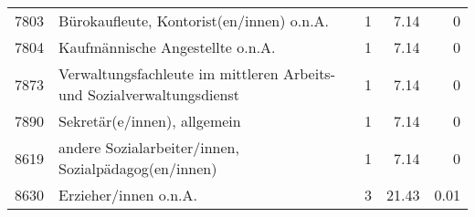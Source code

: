 \begin{longtable}{lXrrr}
     7803 &
     \multicolumn{1}{X}{ Bürokaufleute, Kontorist(en/innen) o.n.A.   } &


       \num{1} &
       \num[round-mode=places,round-precision=2]{7,14} &
         \num[round-mode=places,round-precision=2]{0} \\

     7804 &
     \multicolumn{1}{X}{ Kaufmännische Angestellte o.n.A.   } &


       \num{1} &
       \num[round-mode=places,round-precision=2]{7,14} &
         \num[round-mode=places,round-precision=2]{0} \\

     7873 &
     \multicolumn{1}{X}{ Verwaltungsfachleute im mittleren Arbeits- und Sozialverwaltungsdienst   } &


       \num{1} &
       \num[round-mode=places,round-precision=2]{7,14} &
         \num[round-mode=places,round-precision=2]{0} \\

     7890 &
     \multicolumn{1}{X}{ Sekretär(e/innen), allgemein   } &


       \num{1} &
       \num[round-mode=places,round-precision=2]{7,14} &
         \num[round-mode=places,round-precision=2]{0} \\

     8619 &
     \multicolumn{1}{X}{ andere Sozialarbeiter/innen, Sozialpädagog(en/innen)   } &


       \num{1} &
       \num[round-mode=places,round-precision=2]{7,14} &
         \num[round-mode=places,round-precision=2]{0} \\

     8630 &
     \multicolumn{1}{X}{ Erzieher/innen o.n.A.   } &


       \num{3} &
       \num[round-mode=places,round-precision=2]{21,43} &
         \num[round-mode=places,round-precision=2]{0,01} \\


\end{longtable}
